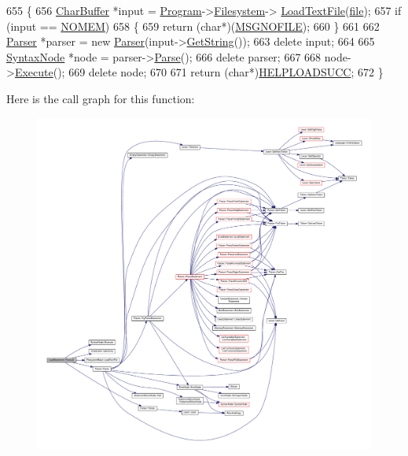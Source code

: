 \begin{DoxyCode}
655 \{
656     \hyperlink{classCharBuffer}{CharBuffer} *input = \hyperlink{classProgram}{Program}->\hyperlink{classProgram_a54fb0dc3ee40a356fe91cea64e569b26}{Filesystem}->
      \hyperlink{classFilesystemBase_adc4a9e1dc189bcd221e3b994bc854d46}{LoadTextFile}(\hyperlink{classLoadStatement_acfe90dcc5509b0f26a52ef742362d46b}{file});
657     \textcolor{keywordflow}{if} (input == \hyperlink{platform_8h_a46ff2bfbf0d44b8466a2251d5bd5e6f8}{NOMEM})
658     \{
659         \textcolor{keywordflow}{return} (\textcolor{keywordtype}{char}*)(\hyperlink{text_8h_ae0de195e949c617eb8a792aeb4d4574e}{MSGNOFILE});
660     \}
661 
662     \hyperlink{classParser}{Parser} *parser = \textcolor{keyword}{new} \hyperlink{classParser}{Parser}(input->\hyperlink{classCharBuffer_a7dfd3feaaf80f318ba44efe15b1ec44b}{GetString}());
663     \textcolor{keyword}{delete} input;
664 
665     \hyperlink{classSyntaxNode}{SyntaxNode} *node = parser->\hyperlink{classParser_a1861d1d9cc6165970cf07e07cacd11df}{Parse}();
666     \textcolor{keyword}{delete} parser;
667 
668     node->\hyperlink{classSyntaxNode_ad8418608fa224536b48a590c87f0a509}{Execute}();
669     \textcolor{keyword}{delete} node;
670 
671     \textcolor{keywordflow}{return} (\textcolor{keywordtype}{char}*)\hyperlink{text_8h_a5d4eccd5e4d8c6e6ce4e1563a01c7873}{HELPLOADSUCC};
672 \}
\end{DoxyCode}


Here is the call graph for this function\+:
\nopagebreak
\begin{figure}[H]
\begin{center}
\leavevmode
\includegraphics[width=350pt]{dd/d4e/classLoadStatement_ae3cbd157ad8de73551ff430fa3c089d9_cgraph}
\end{center}
\end{figure}




